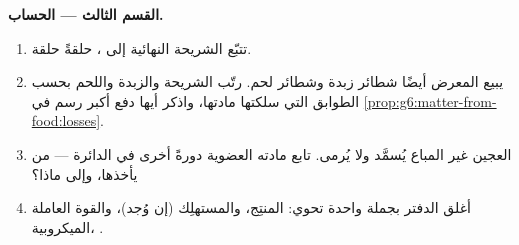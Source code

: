 \begin{problem}
\medskip\noindent\textbf{القسم الثالث --- الحساب.}
\begin{enumerate}[resume]
  \item تتبّع الشريحة النهائية إلى ، حلقةً حلقة.
  \item يبيع المعرض أيضًا شطائر زبدة وشطائر لحم. رتّب الشريحة
        والزبدة واللحم بحسب الطوابق التي سلكتها مادتها، واذكر
        أيها دفع أكبر رسم في
        \cref{prop:g6:matter-from-food:losses}.
  \item العجين غير المباع يُسمَّد ولا يُرمى. تابع مادته العضوية
        دورةً أخرى في الدائرة --- من يأخذها، وإلى ماذا؟
  \item أغلق الدفتر بجملة واحدة تحوي: المنتِج، والمستهلِك (إن
        وُجد)، والقوة العاملة الميكروبية، .
\end{enumerate}
\end{problem}
